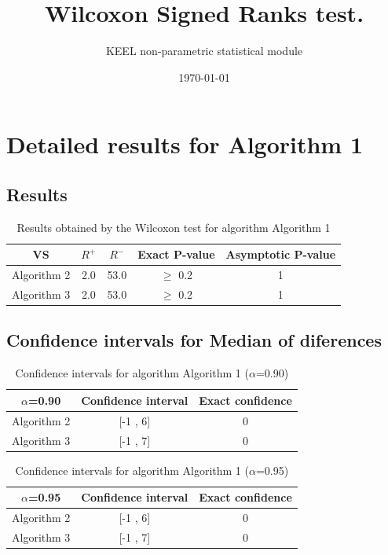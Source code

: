 \documentclass[a4paper,10pt]{article}
\title{Wilcoxon Signed Ranks test.}
\date{\today}
\author{KEEL non-parametric statistical module}
\begin{document}
\pagestyle{empty}
\maketitle
\thispagestyle{empty}



\section{Detailed results for Algorithm 1}


\subsection{Results}

\begin{table}[!htp]
\centering\small
\begin{tabular}{
|c|c|c|c|c|}
\hline
 VS & $R^{+}$ & $R^{-}$ & Exact P-value & Asymptotic P-value \\ \hline 
Algorithm 2 & 2.0 & 53.0 & $\geq$ 0.2 & 1\\ \hline 
Algorithm 3 & 2.0 & 53.0 & $\geq$ 0.2 & 1\\ \hline 

\end{tabular}
\caption{Results obtained by the Wilcoxon test for algorithm Algorithm 1}
\end{table}

\subsection{Confidence intervals for Median of diferences}

\begin{table}[!htp]
\centering\small
\begin{tabular}{
|c|c|c|}
\hline
 $\alpha$=0.90 & Confidence interval & Exact confidence \\ \hline 
Algorithm 2 & [-1 , 6] & 0\\ \hline 
Algorithm 3 & [-1 , 7] & 0\\ \hline 

\end{tabular}
\caption{Confidence intervals for algorithm Algorithm 1 ($\alpha$=0.90)}
\end{table}
\begin{table}[!htp]
\centering\small
\begin{tabular}{
|c|c|c|}
\hline
 $\alpha$=0.95 & Confidence interval & Exact confidence \\ \hline 
Algorithm 2 & [-1 , 6] & 0\\ \hline 
Algorithm 3 & [-1 , 7] & 0\\ \hline 

\end{tabular}
\caption{Confidence intervals for algorithm Algorithm 1 ($\alpha$=0.95)}
\end{table}
\end{document}
